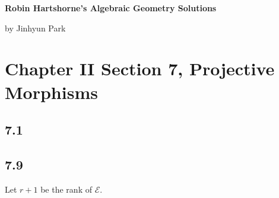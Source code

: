 \documentclass[11pt]{amsart}          %
\newcommand{\calE}{\mathcal{E}}
\begin{document}
\begin{center}
\bf
\large Robin Hartshorne's Algebraic Geometry Solutions
\end{center}
\begin{center}
by Jinhyun Park
\end{center}
\vskip0.5cm

\section*{Chapter II Section 7, Projective Morphisms }

\subsection*{7.1}

\subsection*{7.9}
Let $r+1$ be the rank of $\calE$.
\end{document}
